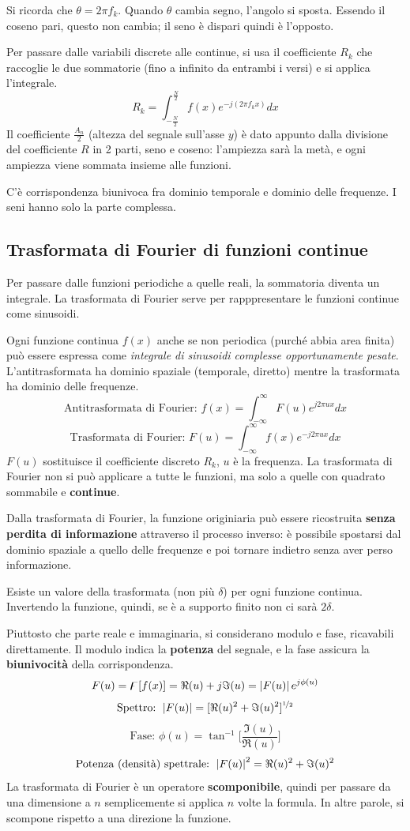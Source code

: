 Si ricorda che $\theta = 2\pi f_k$. Quando $\theta$ cambia segno, l'angolo si sposta. Essendo il coseno pari, questo non cambia; il seno è dispari quindi è l'opposto. 

Per passare dalle variabili discrete alle continue, si usa il coefficiente $R_k$ che raccoglie le due sommatorie (fino a infinito da entrambi i versi) e si applica l'integrale. 
$$R_k = \int_{-\frac{N}{2}}^{\frac{N}{2}} f(x)e^{-j(2\pi f_kx)} dx$$
Il coefficiente $\frac{A_n}{2}$ (altezza del segnale sull'asse $y$) è dato appunto dalla divisione del coefficiente $R$ in 2 parti, seno e coseno: l'ampiezza sarà la metà, e ogni ampiezza viene sommata insieme alle funzioni. 

C'è corrispondenza biunivoca fra dominio temporale e dominio delle frequenze. I seni hanno solo la parte complessa.

\subsection{Trasformata di Fourier di funzioni continue}
Per passare dalle funzioni periodiche a quelle reali, la sommatoria diventa un integrale. La trasformata di Fourier serve per rapppresentare le funzioni continue come sinusoidi.

Ogni funzione continua $f(x)$ anche se non periodica (purché abbia area finita) può essere espressa come \textit{integrale di sinusoidi complesse opportunamente pesate}. L'antitrasformata ha dominio spaziale (temporale, diretto) mentre la trasformata ha dominio delle frequenze.
$$\text{Antitrasformata di Fourier: } f(x) = \int_{-\infty}^{\infty} F(u)e^{j2\pi ux} dx$$
$$\text{Trasformata di Fourier: } F(u) = \int_{-\infty}^{\infty} f(x)e^{-j2\pi ux} dx$$
$F(u)$ sostituisce il coefficiente discreto $R_k$, $u$ è la frequenza. La trasformata di Fourier non si può applicare a tutte le funzioni, ma solo a quelle con quadrato sommabile e \textbf{continue}.

Dalla trasformata di Fourier, la funzione originiaria può essere ricostruita \textbf{senza perdita di informazione} attraverso il processo inverso: è possibile spostarsi dal dominio spaziale a quello delle frequenze e poi tornare indietro senza aver perso informazione.

Esiste un valore della trasformata (non più $\delta$) per ogni funzione continua. Invertendo la funzione, quindi, se è a supporto finito non ci sarà $2\delta$.

Piuttosto che parte reale e immaginaria, si considerano modulo e fase, ricavabili direttamente. Il modulo indica la \textbf{potenza} del segnale, e la fase assicura la \textbf{biunivocità} della corrispondenza. 
$$F(u) = \digamma[f(x)] = \Re(u) + j\Im(u) = \left|F(u)\right|e^{j\phi(u)}$$
$$\text{Spettro: } \left|F(u)\right| = [\Re(u)^2 + \Im(u)^2]^{\nicefrac{1}{2}}$$
$$\text{Fase: } \phi(u) = \tan^{-1} \bigg[\frac{\Im(u)}{\Re(u)}\bigg]$$
$$\text{Potenza (densità) spettrale: } \left|F(u)\right|^2 = \Re(u)^2 + \Im(u)^2$$
La trasformata di Fourier è un operatore \textbf{scomponibile}, quindi per passare da una dimensione a $n$ semplicemente si applica $n$ volte la formula. In altre parole, si scompone rispetto a una direzione la funzione.

